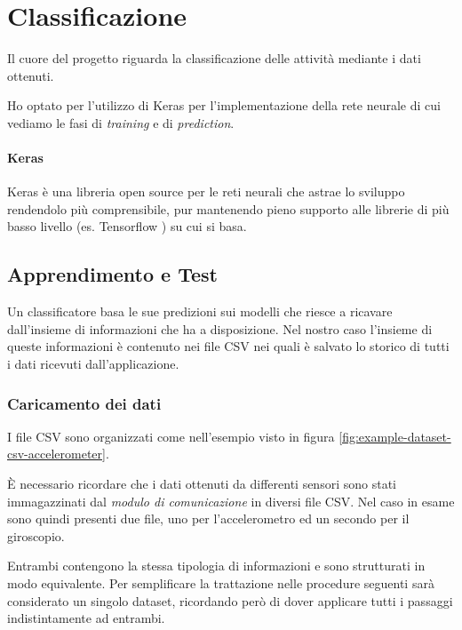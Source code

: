 \chapter{Classificazione}
\label{chapter:classification}

Il cuore del progetto riguarda la classificazione delle attività mediante i dati ottenuti.

Ho optato per l'utilizzo di Keras per l'implementazione della rete neurale di cui vediamo le 
fasi di \textit{training} e di \textit{prediction}.
\subsubsection{Keras}
Keras \cite{keras} è una libreria open source per le reti neurali che astrae lo sviluppo rendendolo più comprensibile, 
pur mantenendo pieno supporto alle librerie di più basso livello (es. Tensorflow \cite{tensorflow}) su cui si basa.



\section{Apprendimento e Test}
Un classificatore basa le sue predizioni sui modelli che riesce a ricavare dall'insieme di informazioni che ha a disposizione.
Nel nostro caso l'insieme di queste informazioni è contenuto nei file CSV nei quali è salvato lo storico di tutti 
i dati ricevuti dall'applicazione.


\subsection{Caricamento dei dati}
I file CSV sono organizzati come nell'esempio visto in figura \ref{fig:example-dataset-csv-accelerometer}.

\vspace{5mm} %

È necessario ricordare che i dati ottenuti da differenti sensori sono stati immagazzinati dal \textit{modulo di comunicazione} in diversi file CSV. 
Nel caso in esame sono quindi presenti due file, uno per l'accelerometro ed un secondo per il giroscopio.

\vspace{5mm} %

Entrambi contengono la stessa tipologia di informazioni e sono strutturati in modo equivalente.
Per semplificare la trattazione nelle procedure seguenti sarà considerato un singolo dataset, ricordando però di dover applicare tutti i 
passaggi indistintamente ad entrambi.

